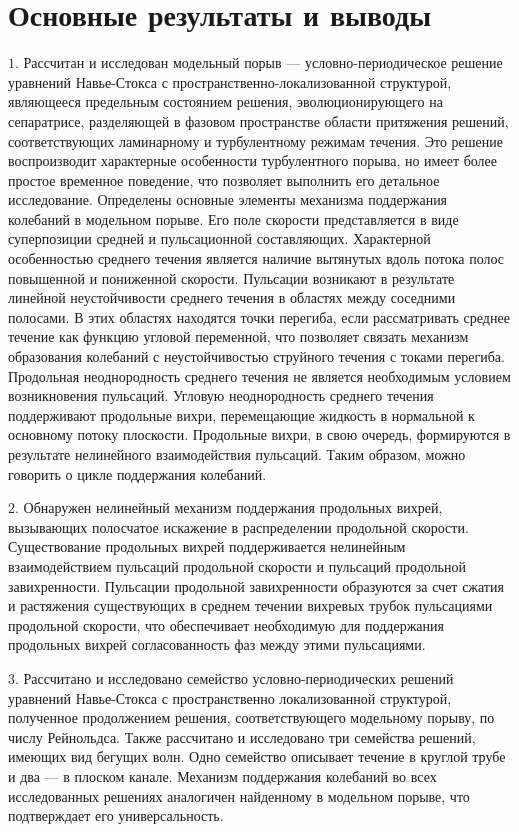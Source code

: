 
\section*{\centering Основные результаты и выводы}

\noindent $1.$ Рассчитан и исследован модельный порыв --- условно-периодическое решение уравнений Навье-Стокса с пространственно-локализованной структурой, являющееся предельным состоянием решения, эволюционирующего на сепаратрисе, разделяющей в фазовом пространстве области притяжения решений, соответствующих ламинарному и турбулентному режимам течения. Это решение воспроизводит характерные особенности турбулентного порыва, но имеет более простое временное поведение, что позволяет выполнить его детальное исследование. Определены основные элементы механизма поддержания колебаний в модельном порыве. Его поле скорости представляется в виде суперпозиции средней и пульсационной составляющих. Характерной особенностью среднего течения является наличие вытянутых вдоль потока полос повышенной и пониженной скорости. Пульсации возникают в результате линейной неустойчивости среднего течения в областях между соседними полосами. В этих областях находятся точки перегиба, если рассматривать среднее течение как функцию угловой переменной, что позволяет связать механизм образования колебаний с неустойчивостью струйного течения с токами перегиба. Продольная неоднородность среднего течения не является необходимым условием возникновения пульсаций. Угловую неоднородность среднего течения поддерживают продольные вихри, перемещающие жидкость в нормальной к основному потоку плоскости. Продольные вихри, в свою очередь, формируются в результате нелинейного взаимодействия пульсаций. Таким образом, можно говорить о цикле поддержания колебаний. 

\noindent $2.$ Обнаружен нелинейный механизм поддержания продольных вихрей, вызывающих полосчатое искажение в распределении продольной скорости. Существование продольных вихрей поддерживается нелинейным взаимодействием пульсаций продольной скорости и пульсаций продольной завихренности. Пульсации продольной завихренности образуются за счет сжатия и растяжения существующих в среднем течении вихревых трубок пульсациями продольной скорости, что обеспечивает необходимую для поддержания продольных вихрей согласованность фаз между этими пульсациями. 

\noindent $3.$ Рассчитано и исследовано семейство условно-периодических решений уравнений Навье-Стокса с пространственно локализованной структурой, полученное продолжением решения, соответствующего модельному порыву, по числу Рейнольдса. Также рассчитано и исследовано три семейства решений, имеющих вид бегущих волн. Одно семейство описывает течение в круглой трубе и два --- в плоском канале. Механизм поддержания колебаний во всех исследованных решениях аналогичен найденному в модельном порыве, что подтверждает его универсальность. 
